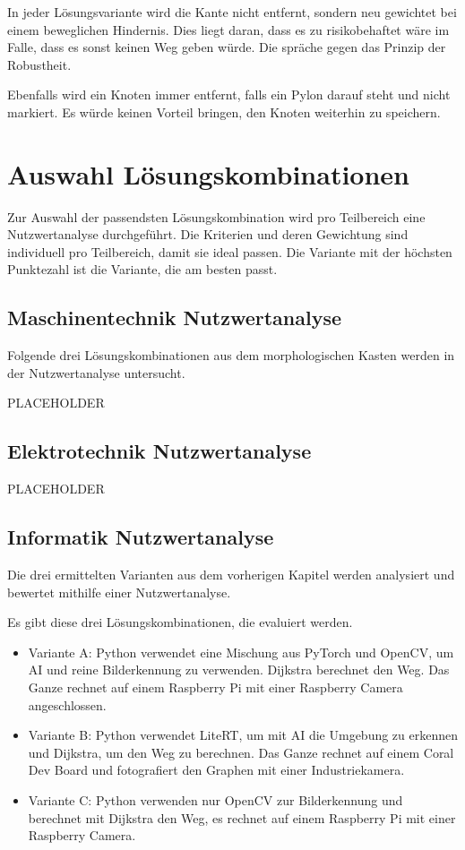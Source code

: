 In jeder Lösungsvariante wird die Kante nicht entfernt, sondern neu gewichtet bei einem beweglichen Hindernis. Dies liegt daran, dass es zu risikobehaftet wäre im Falle, dass es sonst keinen Weg geben würde. Die spräche gegen das Prinzip der Robustheit.

Ebenfalls wird ein Knoten immer entfernt, falls ein Pylon darauf steht und nicht markiert. Es würde keinen Vorteil bringen, den Knoten weiterhin zu speichern.


\newpage
\section{Auswahl Lösungskombinationen}

Zur Auswahl der passendsten Lösungskombination wird pro Teilbereich eine Nutzwertanalyse durchgeführt. Die Kriterien und deren Gewichtung sind individuell pro Teilbereich, damit sie ideal passen. Die Variante mit der höchsten Punktezahl ist die Variante, die am besten passt.

\subsection{Maschinentechnik Nutzwertanalyse}

Folgende drei Lösungskombinationen aus dem morphologischen Kasten werden in der Nutzwertanalyse untersucht. 

PLACEHOLDER

\subsection{Elektrotechnik Nutzwertanalyse}

PLACEHOLDER

\subsection{Informatik Nutzwertanalyse}

Die drei ermittelten Varianten aus dem vorherigen Kapitel werden analysiert und bewertet mithilfe einer Nutzwertanalyse.

Es gibt diese drei Lösungskombinationen, die evaluiert werden.

\begin{itemize}
     \item Variante A: Python verwendet eine Mischung aus PyTorch und OpenCV, um AI und reine Bilderkennung zu verwenden. Dijkstra berechnet den Weg. Das Ganze rechnet auf einem Raspberry Pi mit einer Raspberry Camera angeschlossen.
    \item  Variante B: Python verwendet LiteRT, um mit AI die Umgebung zu erkennen und Dijkstra, um den Weg zu berechnen. Das Ganze rechnet auf einem Coral Dev Board und fotografiert den Graphen mit einer Industriekamera.
    \item Variante C: Python verwenden nur OpenCV zur Bilderkennung und berechnet mit Dijkstra den Weg, es rechnet auf einem Raspberry Pi mit einer Raspberry Camera.
\end{itemize}

